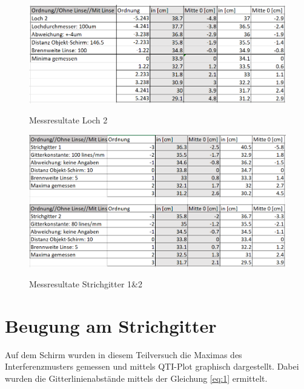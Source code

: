 \begin{figure}[h]
\centering
\includegraphics[width=\textwidth]{Bilder/messung6.png} 
\label{fig:messresultate6}
\caption{Messresultate Loch 2}
\end{figure}
\newpage

\begin{figure}[h]
\centering
\includegraphics[width=\textwidth]{Bilder/messung7.png} 
\label{fig:messresultate7}
\caption{Messresultate Strichgitter 1\&2}
\end{figure}
\newpage

\section{Beugung am Strichgitter}
\label{sec:BeugungAmStrichgitter}
Auf dem Schirm wurden in diesem Teilversuch die Maximas des Interferenzmusters gemessen und mittels QTI-Plot graphisch dargestellt. Dabei wurden die Gitterlinienabstände mittels der Gleichung \ref{eq:1} ermittelt.

